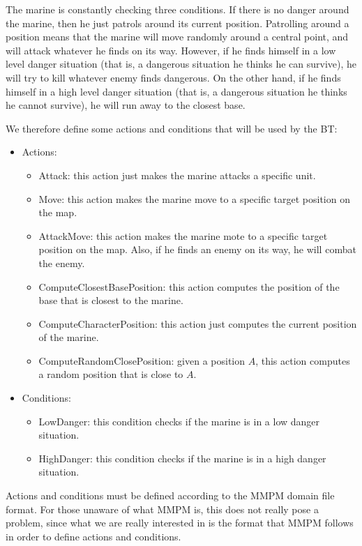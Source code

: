 \documentclass[a4paper]{article}
\begin{document}
The marine is constantly checking three conditions. If there is no danger around the marine, then he just patrols around its current position. Patrolling around a position means that the marine will move randomly around a central point, and will attack whatever he finds on its way. However, if he finds himself in a low level danger situation (that is, a dangerous situation he thinks he can survive), he will try to kill whatever enemy finds dangerous. On the other hand, if he finds himself in a high level danger situation (that is, a dangerous situation he thinks he cannot survive), he will run away to the closest base.

We therefore define some actions and conditions that will be used by the BT:

\begin{itemize}
  \item Actions: 
  \begin{itemize}
	\item Attack: this action just makes the marine attacks a specific unit.
	\item Move: this action makes the marine move to a specific target position on the map.
	\item AttackMove: this action makes the marine mote to a specific target position on the map. Also, if he finds an enemy on its way, he will combat the enemy.
	\item ComputeClosestBasePosition: this action computes the position of the base that is closest to the marine.
	\item ComputeCharacterPosition: this action just computes the current position of the marine.
	\item ComputeRandomClosePosition: given a position $A$, this action computes a random position that is close to $A$.
  \end{itemize}
  \item Conditions:
  \begin{itemize}
	\item LowDanger: this condition checks if the marine is in a low danger situation.
	\item HighDanger: this condition checks if the marine is in a high danger situation.
  \end{itemize}
\end{itemize}

Actions and conditions must be defined according to the MMPM domain file format. For those unaware of what MMPM is, this does not really pose a problem, since what we are really interested in is the format that MMPM follows in order to define actions and conditions.
\end{document}
